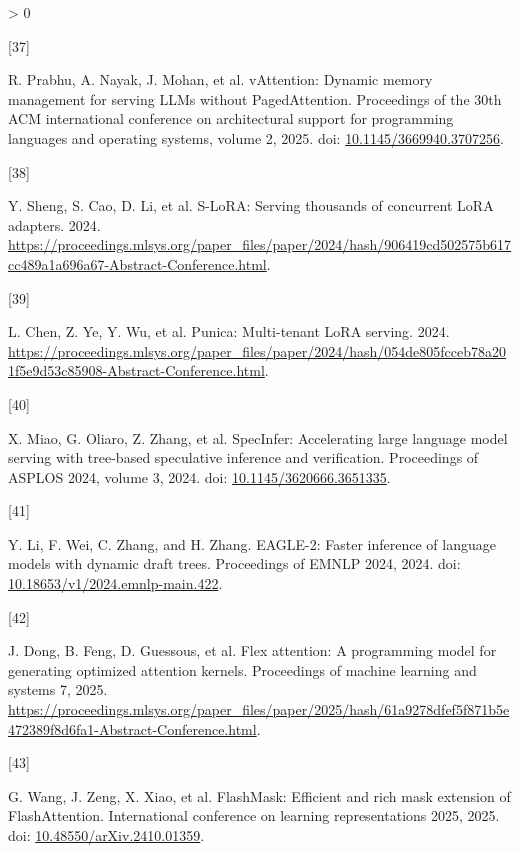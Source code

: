 \documentclass[
  11pt,
  UTF8]{ctexart}
\newlength{\cslhangindent}
\newlength{\csllabelwidth}
\newenvironment{CSLReferences}[2] %
 {%
  \setlength{\parindent}{0pt}
  \ifodd #1 \everypar{\setlength{\hangindent}{\cslhangindent}}\ignorespaces\fi
  \ifnum #2 > 0
  \setlength{\parskip}{#2\baselineskip}
  \fi
 }%
 {}
\newcommand{\CSLLeftMargin}[1]{\parbox[t]{\csllabelwidth}{#1}}
\newcommand{\CSLRightInline}[1]{\parbox[t]{\linewidth - \csllabelwidth}{#1}\break}
\begin{document}
\begin{CSLReferences}{0}{0}
\leavevmode{}%
\CSLLeftMargin{{[}37{]} }
\CSLRightInline{R. Prabhu, A. Nayak, J. Mohan, et al. {vAttention}:
Dynamic memory management for serving {LLMs} without {PagedAttention}.
Proceedings of the 30th ACM international conference on architectural
support for programming languages and operating systems, volume 2, 2025.
doi:
\href{https://doi.org/10.1145/3669940.3707256}{10.1145/3669940.3707256}.}

\leavevmode{}%
\CSLLeftMargin{{[}38{]} }
\CSLRightInline{Y. Sheng, S. Cao, D. Li, et al. S-LoRA: Serving
thousands of concurrent LoRA adapters. 2024.
\url{https://proceedings.mlsys.org/paper_files/paper/2024/hash/906419cd502575b617cc489a1a696a67-Abstract-Conference.html}.}

\leavevmode{}%
\CSLLeftMargin{{[}39{]} }
\CSLRightInline{L. Chen, Z. Ye, Y. Wu, et al. Punica: Multi-tenant LoRA
serving. 2024.
\url{https://proceedings.mlsys.org/paper_files/paper/2024/hash/054de805fcceb78a201f5e9d53c85908-Abstract-Conference.html}.}

\leavevmode{}%
\CSLLeftMargin{{[}40{]} }
\CSLRightInline{X. Miao, G. Oliaro, Z. Zhang, et al. SpecInfer:
Accelerating large language model serving with tree-based speculative
inference and verification. Proceedings of ASPLOS 2024, volume 3, 2024.
doi:
\href{https://doi.org/10.1145/3620666.3651335}{10.1145/3620666.3651335}.}

\leavevmode{}%
\CSLLeftMargin{{[}41{]} }
\CSLRightInline{Y. Li, F. Wei, C. Zhang, and H. Zhang. EAGLE-2: Faster
inference of language models with dynamic draft trees. Proceedings of
EMNLP 2024, 2024. doi:
\href{https://doi.org/10.18653/v1/2024.emnlp-main.422}{10.18653/v1/2024.emnlp-main.422}.}

\leavevmode{}%
\CSLLeftMargin{{[}42{]} }
\CSLRightInline{J. Dong, B. Feng, D. Guessous, et al. Flex attention: A
programming model for generating optimized attention kernels.
Proceedings of machine learning and systems 7, 2025.
\url{https://proceedings.mlsys.org/paper_files/paper/2025/hash/61a9278dfef5f871b5e472389f8d6fa1-Abstract-Conference.html}.}

\leavevmode{}%
\CSLLeftMargin{{[}43{]} }
\CSLRightInline{G. Wang, J. Zeng, X. Xiao, et al. FlashMask: Efficient
and rich mask extension of FlashAttention. International conference on
learning representations 2025, 2025. doi:
\href{https://doi.org/10.48550/arXiv.2410.01359}{10.48550/arXiv.2410.01359}.}


\end{CSLReferences}
\end{document}
